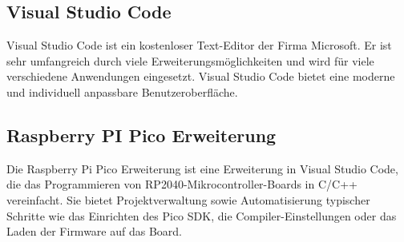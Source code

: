 \begin{inhalt}
\subsection{Visual Studio Code}

Visual Studio Code ist ein kostenloser Text-Editor der Firma Microsoft. Er ist sehr umfangreich durch viele Erweiterungsmöglichkeiten und wird für viele verschiedene Anwendungen eingesetzt. Visual Studio Code bietet eine moderne und individuell anpassbare Benutzeroberfläche. \cite{VisualStudioCode}

\subsection{Raspberry PI Pico Erweiterung}

Die Raspberry Pi Pico Erweiterung ist eine Erweiterung in Visual Studio Code, die das Programmieren von RP2040-Mikrocontroller-Boards in C/C++ vereinfacht. Sie bietet Projektverwaltung sowie Automatisierung typischer Schritte wie das Einrichten des Pico SDK, die Compiler-Einstellungen oder das Laden der Firmware auf das Board. \cite{Raspberry_Pi_Pico_Erweiterung}


\end{inhalt}